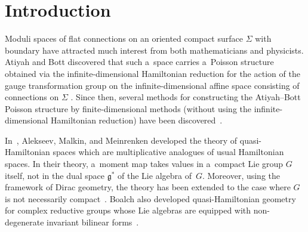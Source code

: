 \documentclass[pdftex]{sigma}
\numberwithin{equation}{section}
\theoremstyle{definition}
\begin{document}
\allowdisplaybreaks

\newcommand{\arXivNumber}{2512.18380}

\renewcommand{\PaperNumber}{088}

\FirstPageHeading










\section{Introduction}

Moduli spaces of flat connections on an oriented compact surface $\Sigma$ with boundary have attracted much interest from both mathematicians and physicists.
Atiyah and Bott discovered that such a~space carries a~Poisson structure obtained via the infinite-dimensional Hamiltonian reduction for the action of the gauge transformation group on the infinite-dimensional affine space consisting of connections on $\Sigma$ \cite{Atiyah-Bott}.
Since then, several methods for constructing the Atiyah--Bott Poisson structure by finite-dimensional methods (without using the infinite-dimensional Hamiltonian reduction) have been discovered~\cite{AMM,F-R,Goldman,YealKarshon}.

In~\cite{AMM}, Alekseev, Malkin, and Meinrenken developed the theory of quasi-Hamiltonian spaces which are multiplicative analogues of usual Hamiltonian spaces.
In their theory, a~moment map takes values in a~compact Lie group $G$ itself, not in the dual space $\mathfrak{g}^*$ of the Lie algebra of~$G$.
Moreover, using the framework of Dirac geometry, the theory has been extended to the case where $G$ is not necessarily compact~\cite{ABM,BHCM}.
Boalch also developed quasi-Hamiltonian geometry for complex reductive groups whose Lie algebras are equipped with non-degenerate invariant bilinear forms~\cite{Boalch_alg_qHam}.
\end{document}
